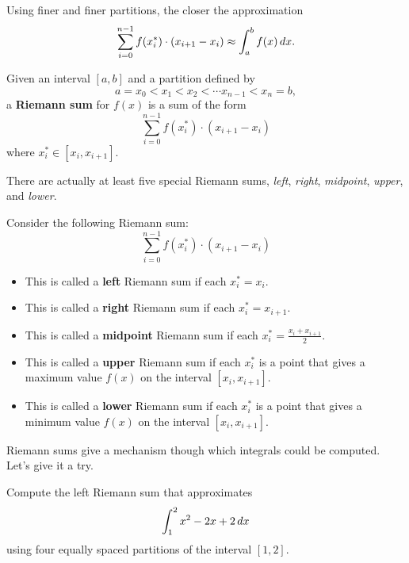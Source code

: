\begin{marginfigure}
\caption{Using finer and finer partitions, the closer the approximation
\[
\sum_{i=0}^{n-1} f(x_i^*) \cdot (x_{i+1}-x_i) \approx \int_a^b f(x) \, d x.
\]}
\label{figure:partitionsfiner}
\end{marginfigure}


\begin{definition}
Given an interval $[a,b]$ and a partition defined by
\[
a = x_0 < x_1 <x_2 < \cdots x_{n-1}< x_n = b,
\]
a \textbf{Riemann sum} for $f(x)$ is a sum of the form
\[
\sum_{i=0}^{n-1} f(x_i^*) \cdot (x_{i+1}-x_i)
\]
where $x_i^*\in [x_i,x_{i+1}]$.
\end{definition}

There are actually at least five special Riemann sums, \textit{left},
\textit{right}, \textit{midpoint}, \textit{upper}, and \textit{lower}.

\begin{definition}
Consider the following Riemann sum:
\[
\sum_{i=0}^{n-1} f(x_i^*) \cdot (x_{i+1}-x_i)
\]
\begin{itemize}
\item This is called a \textbf{left} Riemann sum if each $x_i^* =
  x_i$.
\item This is called a \textbf{right} Riemann sum if each $x_i^* =
  x_{i+1}$.
\item This is called a \textbf{midpoint} Riemann sum if each $x_i^*
  = \frac{x_i+x_{i+1}}{2}$.
\item This is called a \textbf{upper} Riemann sum if each $x_i^*$ is
  a point that gives a maximum value $f(x)$ on the interval
  $[x_i,x_{i+1}]$.
\item This is called a \textbf{lower} Riemann sum if each $x_i^*$ is a
  point that gives a minimum value $f(x)$ on the interval
  $[x_i,x_{i+1}]$.
\end{itemize}
\end{definition}
Riemann sums give a mechanism though which integrals could be
computed. Let's give it a try.

\begin{example}
Compute the left Riemann sum that approximates
\[
\int_1^2 x^2-2x+2\, d x
\]
using four equally spaced partitions of the interval $[1,2]$.
\end{example}

